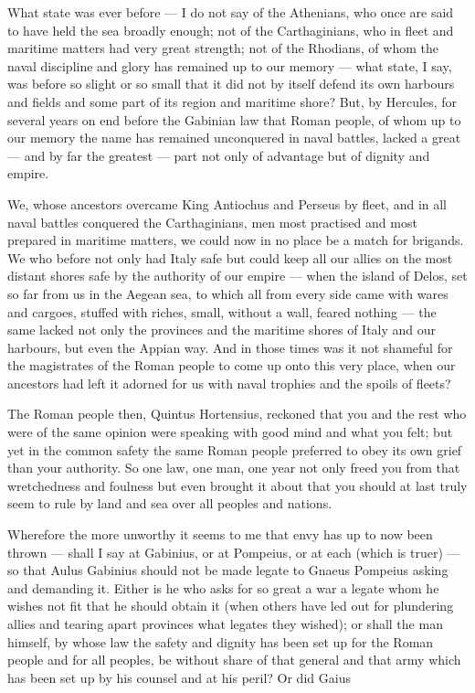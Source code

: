  What state was ever before --- I do not say of the Athenians, who once are said to have held the sea broadly enough; not of the Carthaginians, who in fleet and maritime matters had very great strength; not of the Rhodians, of whom the naval discipline and glory has remained up to our memory --- what state, I say, was before so slight or so small that it did not by itself defend its own harbours and fields and some part of its region and maritime shore? But, by Hercules, for several years on end before the Gabinian law that Roman people, of whom up to our memory the name has remained unconquered in naval battles, lacked a great --- and by far the greatest --- part not only of advantage but of dignity and empire.

 We, whose ancestors overcame King Antiochus and Perseus by fleet, and in all naval battles conquered the Carthaginians, men most practised and most prepared in maritime matters, we could now in no place be a match for brigands. We who before not only had Italy safe but could keep all our allies on the most distant shores safe by the authority of our empire --- when the island of Delos, set so far from us in the Aegean sea, to which all from every side came with wares and cargoes, stuffed with riches, small, without a wall, feared nothing --- the same lacked not only the provinces and the maritime shores of Italy and our harbours, but even the Appian way. And in those times was it not shameful for the magistrates of the Roman people to come up onto this very place, when our ancestors had left it adorned for us with naval trophies and the spoils of fleets?

 The Roman people then, Quintus Hortensius, reckoned that you and the rest who were of the same opinion were speaking with good mind and what you felt; but yet in the common safety the same Roman people preferred to obey its own grief than your authority. So one law, one man, one year not only freed you from that wretchedness and foulness but even brought it about that you should at last truly seem to rule by land and sea over all peoples and nations.

 Wherefore the more unworthy it seems to me that envy has up to now been thrown --- shall I say at Gabinius, or at Pompeius, or at each (which is truer) --- so that Aulus Gabinius should not be made legate to Gnaeus Pompeius asking and demanding it. Either is he who asks for so great a war a legate whom he wishes not fit that he should obtain it (when others have led out for plundering allies and tearing apart provinces what legates they wished); or shall the man himself, by whose law the safety and dignity has been set up for the Roman people and for all peoples, be without share of that general and that army which has been set up by his counsel and at his peril? Or did Gaius

